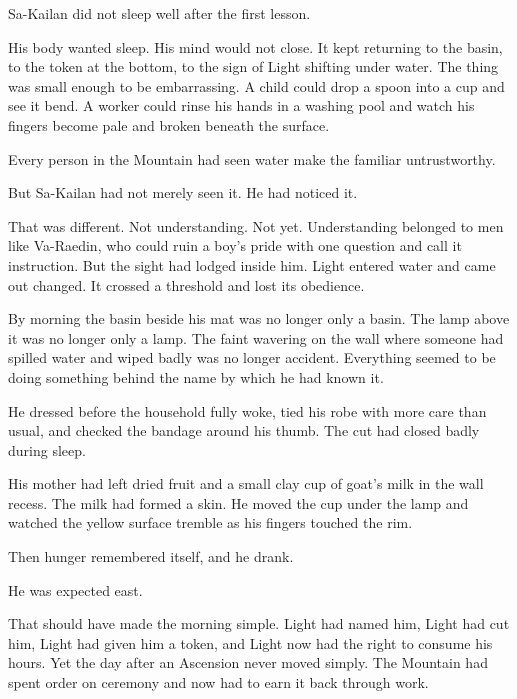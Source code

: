 
\noindent Sa-Kailan did not sleep well after the first lesson.\par

His body wanted sleep.
His mind would not close.
It kept returning to the basin, to the token at the bottom, to the sign of Light shifting under water.
The thing was small enough to be embarrassing.
A child could drop a spoon into a cup and see it bend.
A worker could rinse his hands in a washing pool and watch his fingers become pale and broken beneath the surface.\par

Every person in the Mountain had seen water make the familiar untrustworthy.\par

But Sa-Kailan had not merely seen it.
He had noticed it.\par

That was different.
Not understanding.
Not yet.
Understanding belonged to men like Va-Raedin, who could ruin a boy’s pride with one question and call it instruction.
But the sight had lodged inside him.
Light entered water and came out changed.
It crossed a threshold and lost its obedience.\par

By morning the basin beside his mat was no longer only a basin.
The lamp above it was no longer only a lamp.
The faint wavering on the wall where someone had spilled water and wiped badly was no longer accident.
Everything seemed to be doing something behind the name by which he had known it.\par

He dressed before the household fully woke, tied his robe with more care than usual, and checked the bandage around his thumb.
The cut had closed badly during sleep.\par

His mother had left dried fruit and a small clay cup of goat’s milk in the wall recess.
The milk had formed a skin.
He moved the cup under the lamp and watched the yellow surface tremble as his fingers touched the rim.\par

Then hunger remembered itself, and he drank.\par

He was expected east.\par

That should have made the morning simple.
Light had named him, Light had cut him, Light had given him a token, and Light now had the right to consume his hours.
Yet the day after an Ascension never moved simply.
The Mountain had spent order on ceremony and now had to earn it back through work.\par

